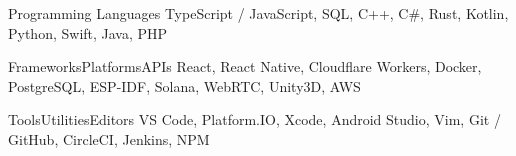 

\begin{cvskills}

  \cvskill
    {Programming Languages} %
    {TypeScript / JavaScript, SQL, C++, C\#, Rust, Kotlin, Python, Swift, Java, PHP} %

  \cvskill
    {Frameworks{\enskip\cdotp\enskip}Platforms{\enskip\cdotp\enskip}APIs} %
    {React, React Native, Cloudflare Workers, Docker, PostgreSQL, ESP-IDF, Solana, WebRTC, Unity3D, AWS} %

  \cvskill
    {Tools{\enskip\cdotp\enskip}Utilities{\enskip\cdotp\enskip}Editors} %
    {VS Code, Platform.IO, Xcode, Android Studio, Vim, Git / GitHub, CircleCI, Jenkins, NPM} %


\end{cvskills}

